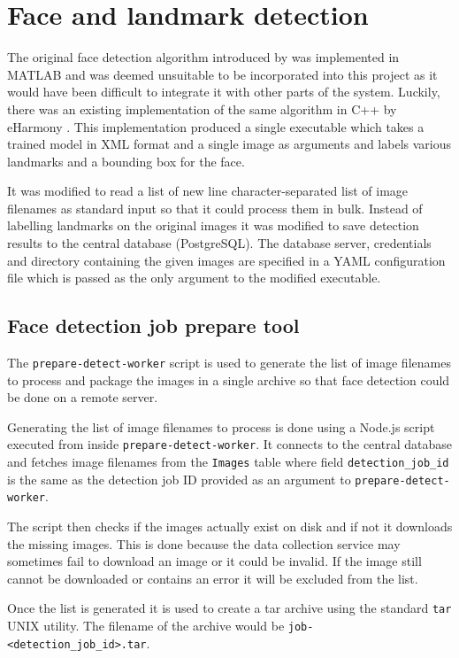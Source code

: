 \section{Face and landmark detection}
\label{impl:fd}
The original face detection algorithm introduced by \citep{zhu2012face} was
implemented in MATLAB and was deemed unsuitable to be incorporated into this
project as it would have been difficult to integrate it with other parts of the
system. Luckily, there was an existing implementation of the same algorithm in
C++ by eHarmony \citep{eHphotofeature}. This implementation produced a single
executable which takes a trained model in XML format and a single image as
arguments and labels various landmarks and a bounding box for the face. 

It was modified to read a list of new line character-separated list of image
filenames as standard input so that it could process them in bulk. Instead of
labelling landmarks on the original images it was modified to save detection
results to the central database (PostgreSQL). The database server, credentials
and directory containing the given images are specified in a \ac{YAML} configuration
file which is passed as the only argument to the modified executable.

\subsection{Face detection job prepare tool}
The \texttt{prepare-detect-worker} script is used to generate the list of image
filenames to process and package the images in a single archive so that face
detection could be done on a remote server.

Generating the list of image filenames to process is done using a Node.js
script executed from inside \texttt{prepare-detect-worker}. It connects to the
central database and fetches image filenames from the \texttt{Images} table
where field \texttt{detection\_job\_id} is the same as the detection job ID
provided as an argument to \texttt{prepare-detect-worker}.

The script then checks if the images actually exist on disk and if not it
downloads the missing images. This is done because the data collection service
may sometimes fail to download an image or it could be invalid. If the image
still cannot be downloaded or contains an error it will be excluded from the
list.

Once the list is generated it is used to create a tar archive using the
standard \texttt{tar} UNIX utility. The filename of the archive would be
\texttt{job-<detection\_job\_id>.tar}.


